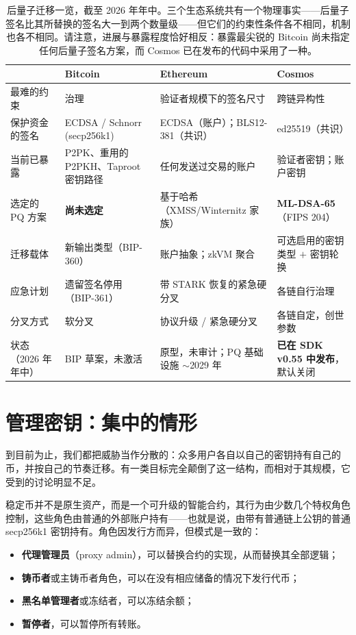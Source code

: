 \begin{table}[H]
\centering
\small
\begin{tabular}{@{}p{2.5cm}p{3.6cm}p{4.0cm}p{4.0cm}@{}}
\toprule
 & \textbf{Bitcoin} & \textbf{Ethereum} & \textbf{Cosmos} \\
\midrule
最难的约束 & 治理 & 验证者规模下的签名尺寸 & 跨链异构性 \\
保护资金的签名 & ECDSA / Schnorr (secp256k1) & ECDSA（账户）；BLS12-381（共识） & ed25519（共识） \\
当前已暴露 & P2PK、重用的 P2PKH、Taproot 密钥路径 & 任何发送过交易的账户 & 验证者密钥；账户密钥 \\
选定的 PQ 方案 & \textbf{尚未选定} & 基于哈希（XMSS/Winternitz 家族） & \textbf{ML-DSA-65}（FIPS 204） \\
迁移载体 & 新输出类型（BIP-360） & 账户抽象；zkVM 聚合 & 可选启用的密钥类型 $+$ 密钥轮换 \\
应急计划 & 遗留签名停用（BIP-361） & 带 STARK 恢复的紧急硬分叉 & 各链自行治理 \\
分叉方式 & 软分叉 & 协议升级 / 紧急硬分叉 & 各链自定，创世参数 \\
状态（2026 年年中） & BIP 草案，未激活 & 原型，未审计；PQ 基础设施 $\sim$2029 年 & \textbf{已在 SDK v0.55 中发布}，默认关闭 \\
\bottomrule
\end{tabular}
\caption{后量子迁移一览，截至 2026 年年中。三个生态系统共有一个物理事实——后量子签名比其所替换的签名大一到两个数量级——但它们的约束性条件各不相同，机制也各不相同。请注意，进展与暴露程度恰好相反：暴露最尖锐的 Bitcoin 尚未指定任何后量子签名方案，而 Cosmos 已在发布的代码中采用了一种。}
\label{tab:chain-migration}
\end{table}


\section{管理密钥：集中的情形}
\label{sec:admin-keys}

到目前为止，我们都把威胁当作分散的：众多用户各自以自己的密钥持有自己的币，并按自己的节奏迁移。有一类目标完全颠倒了这一结构，而相对于其规模，它受到的讨论明显不足。

稳定币并不是原生资产，而是一个可升级的智能合约，其行为由少数几个特权角色控制，这些角色由普通的外部账户持有——也就是说，由带有普通链上公钥的普通 secp256k1 密钥持有。角色因发行方而异，但模式是一致的：

\begin{itemize}
  \item \textbf{代理管理员}（proxy admin），可以替换合约的实现，从而替换其全部逻辑；
  \item \textbf{铸币者}或主铸币者角色，可以在没有相应储备的情况下发行代币；
  \item \textbf{黑名单管理者}或冻结者，可以冻结余额；
  \item \textbf{暂停者}，可以暂停所有转账。
\end{itemize}

